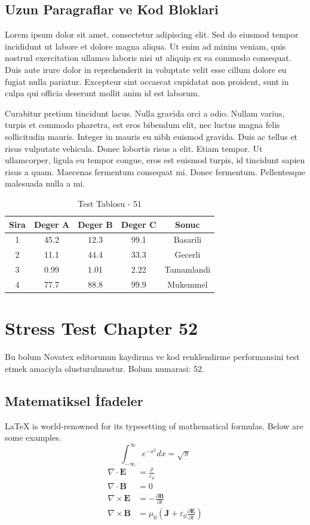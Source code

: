 \documentclass[12pt,a4paper]{article}
\begin{document}
\subsection{Uzun Paragraflar ve Kod Bloklari}
Lorem ipsum dolor sit amet, consectetur adipiscing elit. Sed do eiusmod tempor incididunt ut labore et dolore magna aliqua. Ut enim ad minim veniam, quis nostrud exercitation ullamco laboris nisi ut aliquip ex ea commodo consequat. Duis aute irure dolor in reprehenderit in voluptate velit esse cillum dolore eu fugiat nulla pariatur. Excepteur sint occaecat cupidatat non proident, sunt in culpa qui officia deserunt mollit anim id est laborum.

Curabitur pretium tincidunt lacus. Nulla gravida orci a odio. Nullam varius, turpis et commodo pharetra, est eros bibendum elit, nec luctus magna felis sollicitudin mauris. Integer in mauris eu nibh euismod gravida. Duis ac tellus et risus vulputate vehicula. Donec lobortis risus a elit. Etiam tempor. Ut ullamcorper, ligula eu tempor congue, eros est euismod turpis, id tincidunt sapien risus a quam. Maecenas fermentum consequat mi. Donec fermentum. Pellentesque malesuada nulla a mi.

\begin{table}[h!]
\centering
\begin{tabular}{|c|c|c|c|c|}
\hline
\textbf{Sira} & \textbf{Deger A} & \textbf{Deger B} & \textbf{Deger C} & \textbf{Sonuc} \\
\hline
1 & 45.2 & 12.3 & 99.1 & Basarili \\
2 & 11.1 & 44.4 & 33.3 & Gecerli \\
3 & 0.99 & 1.01 & 2.22 & Tamamlandi \\
4 & 77.7 & 88.8 & 99.9 & Mukemmel \\
\hline
\end{tabular}
\caption{Test Tablosu - 51}
\end{table}

\newpage
\section{Stress Test Chapter 52}
Bu bolum Novatex editorunun kaydirma ve kod renklendirme performansini test etmek amaciyla olusturulmustur. Bolum numarasi: 52.

\subsection{Matematiksel İfadeler}
\LaTeX{} is world-renowned for its typesetting of mathematical formulas. Below are some examples.
\begin{equation}
\int_{-\infty}^{\infty} e^{-x^2} dx = \sqrt{\pi}
\end{equation}
\begin{align}
\nabla \cdot \mathbf{E} &= \frac{\rho}{\varepsilon_0} \\
\nabla \cdot \mathbf{B} &= 0 \\
\nabla \times \mathbf{E} &= -\frac{\partial \mathbf{B}}{\partial t} \\
\nabla \times \mathbf{B} &= \mu_0\left(\mathbf{J} + \varepsilon_0 \frac{\partial \mathbf{E}}{\partial t}\right)
\end{align}
\end{document}
